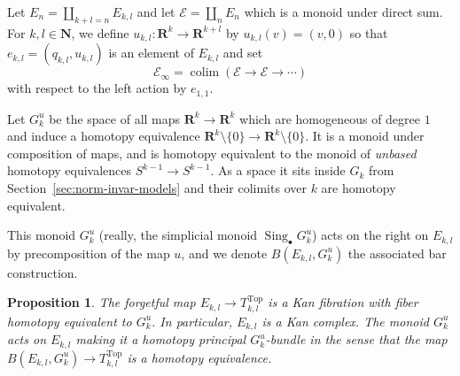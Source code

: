 \documentclass[reqno]{amsart}
\theoremstyle{theorem}
\newtheorem{proposition}[corollary]{Proposition}
\theoremstyle{remark}
\theoremstyle{definition}
\DeclareMathOperator*{\colim}{colim}
\newcommand{\E}{\mathcal{E}}
\newcommand{\R}{\mathbf{R}}
\newcommand{\N}{\mathbf{N}}
\DeclareMathOperator{\sing}{Sing}
\newcommand{\TOP}{\mathrm{Top}}
\begin{document}
Let $E_n=\coprod_{k+l=n} E_{k,l}$ and let $\E=\coprod_n E_n$ which is a monoid under direct sum.
For $k,l\in \N$, we define $u_{k,l}:\R^k\to \R^{k+l}$ by $u_{k,l}(v)=(v,0)$ so that $e_{k,l}=(q_{k,l},u_{k,l})$ is an element of $E_{k,l}$ and set
\[\E_\infty=\colim(\E \to \E \to \cdots)\]
with respect to the left action by $e_{1,1}$.




Let $G_k^u$ be the space of all maps $\R^k\to\R^k$ which are homogeneous of degree $1$ and induce a homotopy equivalence
$\R^k\setminus \{0\}\to \R^k\setminus\{0\}$. It is a monoid under composition of maps, and is homotopy equivalent
to the monoid of \emph{unbased} homotopy equivalences $S^{k-1}\to S^{k-1}$. As a space it sits inside $G_k$ from Section~\ref{sec:norm-invar-models} and their colimits over $k$ are homotopy equivalent.


This monoid $G_k^u$ (really, the simplicial monoid $\sing_\bullet G_k^u$) acts on the right on $E_{k,l}$ by precomposition of the map $u$,
and we denote $B(E_{k,l},G_k^u)$ the associated bar construction.


\begin{proposition} \label{prop:twisted-derivative:2}
The forgetful map $E_{k,l}\to T^\TOP_{k,l}$ is a Kan fibration with fiber homotopy equivalent to $G^u_k$. In particular,  $E_{k,l}$ is a Kan complex. The monoid $G_k^u$ acts on $E_{k,l}$ making it a homotopy principal $G^u_k$-bundle
in the sense that the map $B(E_{k,l},G^u_k) \to T^\TOP_{k,l}$ is a homotopy equivalence.
\end{proposition}
\end{document}
